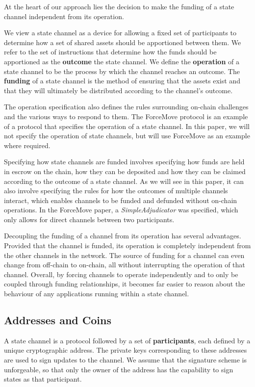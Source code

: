 \documentclass{article}
\begin{document}
At the heart of our approach lies the decision to make the funding of a state channel independent from its operation.

We view a state channel as a device for allowing a fixed set of participants to determine how a set of shared assets should be apportioned between them.
We refer to the set of instructions that determine how the funds should be apportioned as the  \textbf{outcome} the state channel.
We define the \textbf{operation} of a state channel to be the process by which the channel reaches an outcome. 
The \textbf{funding} of a state channel is the method of ensuring that the assets exist and that they will ultimately be distributed according to the channel's outcome.

The operation specification also defines the rules surrounding on-chain challenges and the various ways to respond to them.
The ForceMove protocol is an example of a protocol that specifies the operation of a state channel.
In this paper, we will not specify the operation of state channels, but will use ForceMove as an example where required.

Specifying how state channels are funded involves specifying how funds are held in escrow on the chain, how they can be deposited and how they can be claimed according to the outcome of a state channel.
As we will see in this paper, it can also involve specifying the rules for how the outcomes of multiple channels interact, which enables channels to be funded and defunded without on-chain operations.
In the ForceMove paper, a \textit{SimpleAdjudicator} was specified, which only allows for direct channels between two participants.

Decoupling the funding of a channel from its operation has several advantages.
Provided that the channel is funded, its operation is completely independent from the other channels in the network.
The source of funding for a channel can even change from off-chain to on-chain, all without interrupting the operation of that channel.
Overall, by forcing channels to operate independently and to only be coupled through funding relationships, it becomes far easier to reason about the behaviour of any applications running within a state channel.


\subsection{Addresses and Coins}

A state channel is a protocol followed by a set of \textbf{participants}, each defined by a unique cryptographic address.
The private keys corresponding to these addresses are used to sign updates to the channel.
We assume that the signature scheme is unforgeable, so that only the owner of the address has the capability to sign states as that participant.
\end{document}
